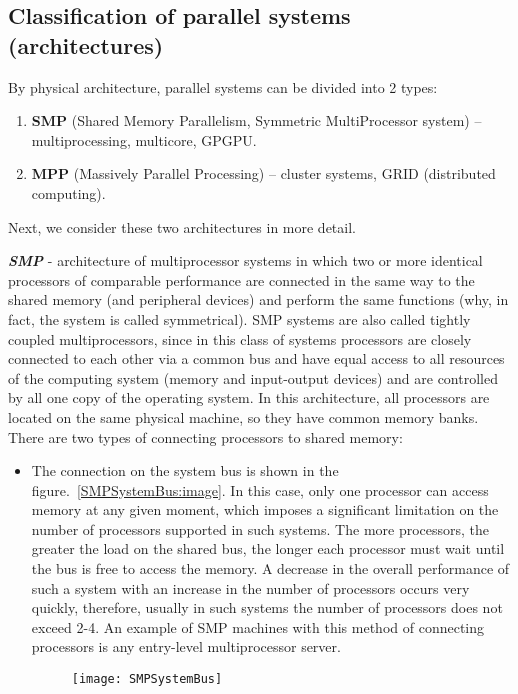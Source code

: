 { %
	\subsection{Classification of parallel systems (architectures)}
	\par By physical architecture, parallel systems can be divided into 2 types:
		\begin{enumerate}
			\item\textbf{SMP} (Shared Memory Parallelism, Symmetric MultiProcessor system) – multiprocessing, multicore, GPGPU. 
			\item\textbf{MPP} (Massively Parallel Processing) – cluster systems, GRID (distributed computing).
		\end{enumerate}
	\par Next, we consider these two architectures in more detail.
	\par\textbf{\textit{SMP}}  - architecture of multiprocessor systems in which two or more identical processors of comparable performance are connected in the same way to the shared memory (and peripheral devices) and perform the same functions (why, in fact, the system is called symmetrical). SMP systems are also called tightly coupled multiprocessors, since in this class of systems processors are closely connected to each other via a common bus and have equal access to all resources of the computing system (memory and input-output devices) and are controlled by all one copy of the operating system. In this architecture, all processors are located on the same physical machine, so they have common memory banks. There are two types of connecting processors to shared memory:
		\begin{itemize}
			\item The connection on the system bus is shown in the figure.~\ref{SMPSystemBus:image}. In this case, only one processor can access memory at any given moment, which imposes a significant limitation on the number of processors supported in such systems. The more processors, the greater the load on the shared bus, the longer each processor must wait until the bus is free to access the memory. A decrease in the overall performance of such a system with an increase in the number of processors occurs very quickly, therefore, usually in such systems the number of processors does not exceed 2-4. An example of SMP machines with this method of connecting processors is any entry-level multiprocessor server.
				\begin{figure}[H]
					\texttt{[image: SMPSystemBus]}

\end{figure}
\end{itemize}}
